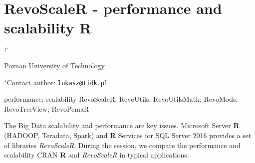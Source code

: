 \documentclass[\main/boa.tex]{subfiles}
\begin{document}
\section{RevoScaleR - performance and scalability R}

\begin{center}
  {\bf {}$^{1^\star}$}
\end{center}

\vskip 0.3cm

\begin{affiliations}
\begin{enumerate}
\begin{minipage}{0.915\textwidth}
\centering
\item Poznan University of Technology \\[-2pt]
\end{minipage}
\end{enumerate}
$^\star$Contact author: \href{mailto:lukasz@tidk.pl}{\nolinkurl{lukasz@tidk.pl}}\\
\end{affiliations}

\vskip 0.5cm

\begin{minipage}{0.915\textwidth}
\keywords performance; scalability
\packages RevoScaleR; RevoUtils; RevoUtilsMath; RevoMods; RevoTreeView; RevoPemaR
\end{minipage}

\vskip 0.8cm

The Big Data scalability and performance are key issues. Microsoft
Server \textbf{R} (HADOOP, Teradata, Spark) and \textbf{R} Services for
SQL Server 2016 provides a set of libraries \emph{RevoScaleR}. During
the session, we compare the performance and scalability CRAN \textbf{R}
and \emph{RevoScaleR} in typical applications.
\end{document}

